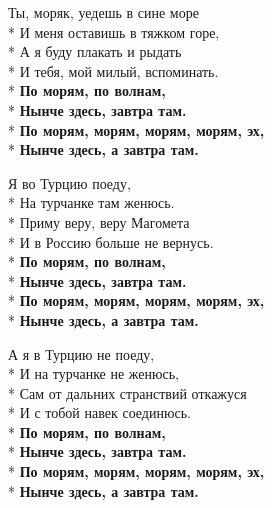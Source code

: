 \medskip

\begin{minipage}{\linewidth}
Ты, моряк, уедешь в сине море\\*
И меня оставишь в тяжком горе,\\*
А я буду плакать и рыдать\\*
И тебя, мой милый, вспоминать.\\*
\hspace*{1.5em}\textbf{По морям, по волнам,}\\*
\hspace*{1.5em}\textbf{Нынче здесь, завтра там.}\\*
\hspace*{1.5em}\textbf{По морям, морям, морям, морям, эх,}\\*
\hspace*{1.5em}\textbf{Нынче здесь, а завтра там.}\\
\end{minipage}\par\medskip\nobreak

\medskip

\begin{minipage}{\linewidth}
Я во Турцию поеду,\\*
На турчанке там женюсь.\\*
Приму веру, веру Магомета\\*
И в Россию больше не вернусь.\\*
\hspace*{1.5em}\textbf{По морям, по волнам,}\\*
\hspace*{1.5em}\textbf{Нынче здесь, завтра там.}\\*
\hspace*{1.5em}\textbf{По морям, морям, морям, морям, эх,}\\*
\hspace*{1.5em}\textbf{Нынче здесь, а завтра там.}\\
\end{minipage}\par\medskip\nobreak

\medskip

\begin{minipage}{\linewidth}
А я в Турцию не поеду,\\*
И на турчанке не женюсь,\\*
Сам от дальних странствий откажуся\\*
И с тобой навек соединюсь.\\*
\hspace*{1.5em}\textbf{По морям, по волнам,}\\*
\hspace*{1.5em}\textbf{Нынче здесь, завтра там.}\\*
\hspace*{1.5em}\textbf{По морям, морям, морям, морям, эх,}\\*
\hspace*{1.5em}\textbf{Нынче здесь, а завтра там.}\\
\end{minipage}

